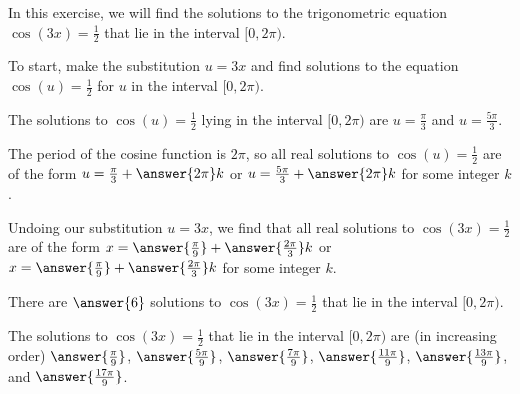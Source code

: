 \documentclass{ximera}
\author{Kenneth Berglund}
\begin{document}
\licenseSZ
In this exercise, we will find the solutions to the trigonometric equation $\cos(3x) = \frac{1}{2}$ that lie in the interval $[0, 2\pi)$.

To start, make the substitution $u = 3x$ and find solutions to the equation $\cos(u) = \frac{1}{2}$ for $u$ in the interval $[0, 2\pi)$. 

The solutions to $\cos(u) = \frac{1}{2}$ lying in the interval $[0, 2\pi)$ are $u = \frac{\pi}{3}$ and $u = \frac{5\pi}{3}$.

\begin{exercise}
The period of the cosine function is $2\pi$, so all real solutions to $\cos(u) = \frac{1}{2}$ are of the form $u = \frac{\pi}{3} + \answer{2\pi}k$ or $u = \frac{5\pi}{3} + \answer{2\pi}k$ for some integer $k$. 

\begin{exercise}
Undoing our substitution $u = 3x$, we find that all real solutions to $\cos(3x) = \frac{1}{2}$ are of the form $x = \answer{\frac{\pi}{9}} + \answer{\frac{2\pi}{3}}k$ or $x = \answer{\frac{\pi}{9}} + \answer{\frac{2\pi}{3}}k$ for some integer $k$.

\begin{exercise}
There are $\answer{6}$ solutions to $\cos(3x) = \frac{1}{2}$ that lie in the interval $[0, 2\pi)$.

\begin{exercise}
The solutions to $\cos(3x) = \frac{1}{2}$ that lie in the interval $[0, 2\pi)$ are (in increasing order) $\answer{\frac{\pi}{9}}$, $\answer{\frac{5\pi}{9}}$, $\answer{\frac{7\pi}{9}}$, $\answer{\frac{11\pi}{9}}$, $\answer{\frac{13\pi}{9}}$, and $\answer{\frac{17\pi}{9}}$.


\end{exercise}
\end{exercise}
\end{exercise}
\end{exercise}
\end{document}
